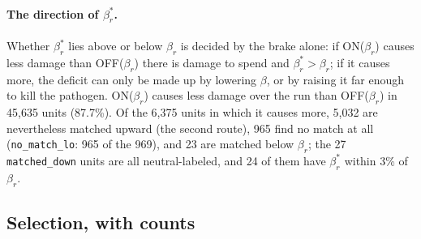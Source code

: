 \documentclass[11pt]{article}
\begin{document}
\paragraph{The direction of $\beta_r^{*}$.} Whether $\beta_r^{*}$ lies above or below $\beta_r$ is
decided by the brake alone: if ON($\beta_r$) causes less damage than OFF($\beta_r$) there is
damage to spend and $\beta_r^{*} > \beta_r$; if it causes more, the deficit can only be made up by
lowering $\beta$, or by raising it far enough to kill the pathogen. ON($\beta_r$) causes less
damage over the run than OFF($\beta_r$) in 45{,}635 units (87.7\%). Of the 6{,}375 units in which
it causes more, 5{,}032 are nevertheless matched upward (the second route), 965 find no match
at all (\texttt{no\_match\_lo}: 965 of the 969), and 23 are matched below $\beta_r$; the 27
\texttt{matched\_down} units are all neutral-labeled, and 24 of them have $\beta_r^{*}$ within
3\% of $\beta_r$.

\subsection{Selection, with counts}
\label{sec:dm_filter}
\end{document}
